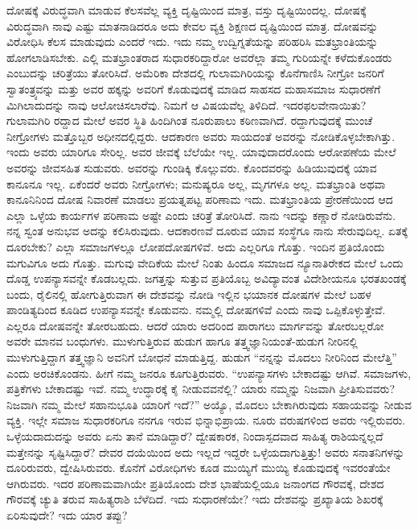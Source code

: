 ದೋಷಕ್ಕೆ ವಿರುದ್ಧವಾಗಿ ಮಾಡುವ ಕೆಲಸವೆಲ್ಲ ವ್ಯಕ್ತಿ ದೃಷ್ಟಿಯಿಂದ ಮಾತ್ರ, ವಸ್ತು ದೃಷ್ಟಿಯಿಂದಲ್ಲ. ದೋಷಕ್ಕೆ ವಿರುದ್ಧವಾಗಿ ನಾವು ಎಷ್ಟು ಮಾತನಾಡಿದರೂ ಅದು ಕೇವಲ ವ್ಯಕ್ತಿ ಶಿಕ್ಷಣದ ದೃಷ್ಟಿಯಿಂದ ಮಾತ್ರ. ದೋಷವನ್ನು ವಿರೋಧಿಸಿ ಕೆಲಸ ಮಾಡುವುದು ಎಂದರೆ ಇದು. ಇದು ನಮ್ಮ ಉದ್ವಿಗ್ನತೆಯನ್ನು ಪರಿಹರಿಸಿ ಮತಭ್ರಾಂತಿಯನ್ನು ಹೋಗಲಾಡಿಸಬೇಕು. ಎಲ್ಲಿ ಮತಭ್ರಾಂತರಾದ ಸುಧಾರಕರಿದ್ದಾರೋ ಅವರೆಲ್ಲಾ ತಮ್ಮ ಗುರಿಯನ್ನೇ ಕಳೆದುಕೊಂಡರು ಎಂಬುದನ್ನು ಚರಿತ್ರೆಯು ತೋರಿಸಿದೆ. ಅಮೆರಿಕಾ ದೇಶದಲ್ಲಿ ಗುಲಾಮಗಿರಿಯನ್ನು ಕೊನೆಗಾಣಿಸಿ ನೀಗ್ರೋ ಜನರಿಗೆ ಸ್ವಾತಂತ್ರ್ಯವನ್ನು ಮತ್ತು ಅವರ ಹಕ್ಕನ್ನು ಅವರಿಗೆ ಕೊಡುವುದಕ್ಕೆ ಮಾಡಿದ ಸಾಹಸದ ಮಹಾಸಮಾಜ ಸುಧಾರಣೆಗೆ ಮಿಗಿಲಾದುದನ್ನು ನಾವು ಆಲೋಚಿಸಲಾರೆವು. ನಿಮಗೆ ಆ ವಿಷಯವೆಲ್ಲ ತಿಳಿದಿದೆ. ಇದರ\break ಫಲವೇನಾಯಿತು? ಗುಲಾಮಗಿರಿ ರದ್ದಾದ ಮೇಲೆ ಅವರ ಸ್ಥಿತಿ ಹಿಂದಿಗಿಂತ ನೂರುಪಾಲು ಕಠಿಣವಾಗಿದೆ. ರದ್ದಾಗುವುದಕ್ಕೆ ಮುಂಚೆ ನೀಗ್ರೋಗಳು ಮತ್ತೊಬ್ಬರ ಅಧೀನದಲ್ಲಿದ್ದರು. ಆದಕಾರಣ ಅವರು ಸಾಯದಂತೆ ಅವರನ್ನು ನೋಡಿಕೊಳ್ಳಬೇಕಾಗಿತ್ತು. ಇಂದು ಅವರು ಯಾರಿಗೂ ಸೇರಿಲ್ಲ. ಅವರ ಜೀವಕ್ಕೆ ಬೆಲೆಯೇ ಇಲ್ಲ. ಯಾವುದಾದರೊಂದು ಆರೋಪಣೆಯ ಮೇಲೆ ಅವರನ್ನು ಜೀವಸಹಿತ ಸುಡುವರು. ಅವರನ್ನು ಗುಂಡಿಕ್ಕಿ ಕೊಲ್ಲುವರು. ಕೊಂದವರನ್ನು ಹಿಡಿಯುವುದಕ್ಕೆ ಯಾವ ಕಾನೂನೂ ಇಲ್ಲ. ಏಕೆಂದರೆ ಅವರು ನೀಗ್ರೋಗಳು; ಮನುಷ್ಯರೂ ಅಲ್ಲ, ಮೃಗಗಳೂ ಅಲ್ಲ. ಮತಭ್ರಾಂತಿ ಅಥವಾ ಕಾನೂನಿನಿಂದ ದೋಷ ನಿವಾರಣೆ ಮಾಡಲು ಪ್ರಯತ್ನಪಟ್ಟ ಪರಿಣಾಮ ಇದು. ಮತಭ್ರಾಂತಿಯ ಪ್ರೇರಣೆಯಿಂದ ಆದ ಎಲ್ಲಾ ಒಳ್ಳೆಯ ಕಾರ್ಯಗಳ ಪರಿಣಾಮ ಅಷ್ಟೇ ಎಂದು ಚರಿತ್ರೆ ತೋರಿಸಿದೆ. ನಾನು ಇದನ್ನು ಕಣ್ಣಾರೆ ನೋಡಿರುವೆನು. ನನ್ನ ಸ್ವಂತ ಅನುಭವ ಅದನ್ನು ಕಲಿಸಿರುವುದು. ಆದಕಾರಣವೆ ದೂರುವ ಯಾವ ಸಂಸ್ಥೆಗೂ ನಾನು ಸೇರುವುದಿಲ್ಲ. ಏತಕ್ಕೆ ದೂರಬೇಕು? ಎಲ್ಲಾ ಸಮಾಜಗಳಲ್ಲೂ ಲೋಪದೋಷಗಳಿವೆ. ಅದು ಎಲ್ಲರಿಗೂ ಗೊತ್ತು. ಇಂದಿನ ಪ್ರತಿಯೊಂದು ಮಗುವಿಗೂ ಅದು ಗೊತ್ತು. ಮಗುವು ವೇದಿಕೆಯ ಮೇಲೆ ನಿಂತು ಹಿಂದೂ ಸಮಾಜದ ನ್ಯೂನಾತಿರೇಕದ ಮೇಲೆ ಒಂದು ದೊಡ್ಡ ಉಪನ್ಯಾಸವನ್ನೇ ಕೊಡಬಲ್ಲದು. ಜಗತ್ತನ್ನು ಸುತ್ತುವ ಪ್ರತಿಯೊಬ್ಬ ಅವಿದ್ಯಾವಂತ ವಿದೇಶೀಯನೂ ಭರತಖಂಡಕ್ಕೆ ಬಂದು, ರೈಲಿನಲ್ಲಿ ಹೋಗುತ್ತಿರುವಾಗ ಈ ದೇಶವನ್ನು ನೋಡಿ ಇಲ್ಲಿನ ಭಯಾನಕ ದೋಷಗಳ ಮೇಲೆ ಬಹಳ ಪಾಂಡಿತ್ಯದಿಂದ ಕೂಡಿದ ಉಪನ್ಯಾಸವನ್ನೇ ಕೊಡುವನು. ನಮ್ಮಲ್ಲಿ ದೋಷಗಳಿವೆ ಎಂದು ನಾವು ಒಪ್ಪಿಕೊಳ್ಳುತ್ತೇವೆ. ಎಲ್ಲರೂ ದೋಷವನ್ನೇ ತೋರಬಹುದು. ಆದರೆ ಯಾರು ಅದರಿಂದ ಪಾರಾಗಲು ಮಾರ್ಗವನ್ನು ತೋರಬಲ್ಲರೋ ಅವರೇ ಮಾನವ ಬಂಧುಗಳು. ಮುಳುಗುತ್ತಿರುವ ಹುಡುಗ ಹಾಗೂ ತತ್ತ್ವಜ್ಞಾನಿಯಂತೆ-ಹುಡುಗ ನೀರಿನಲ್ಲಿ ಮುಳುಗುತ್ತಿದ್ದಾಗ ತತ್ತ್ವಜ್ಞಾನಿ ಅವನಿಗೆ ಬೋಧನೆ ಮಾಡುತ್ತಿದ್ದ. ಹುಡುಗ “ನನ್ನನ್ನು ಮೊದಲು ನೀರಿನಿಂದ ಮೇಲೆತ್ತಿ” ಎಂದು ಅರಚಿಕೊಂಡನು. ಹೀಗೆ ನಮ್ಮ ಜನರೂ ಕೂಗುತ್ತಿರುವರು. “ಉಪನ್ಯಾಸಗಳು ಬೇಕಾದಷ್ಟು ಆಗಿವೆ. ಸಮಾಜಗಳು, ಪತ್ರಿಕೆಗಳು ಬೇಕಾದಷ್ಟು ಇವೆ. ನಮ್ಮ ಉದ್ಧಾರಕ್ಕೆ ಕೈ ನೀಡುವವನೆಲ್ಲಿ? ಯಾರು ನಮ್ಮನ್ನು ನಿಜವಾಗಿ ಪ್ರೀತಿಸುವವರು? ನಿಜವಾಗಿ ನಮ್ಮ ಮೇಲೆ ಸಹಾನುಭೂತಿ ಯಾರಿಗೆ ಇದೆ?” ಅಯ್ಯೊ, ಮೊದಲು ಬೇಕಾಗಿರುವುದು ಸಹಾಯವನ್ನು ನೀಡುವ ವ್ಯಕ್ತಿ. ಇಲ್ಲೇ ಸಮಾಜ ಸುಧಾರಕರಿಗೂ ನನಗೂ ಇರುವ ಭಿನ್ನಾಭಿಪ್ರಾಯ. ನೂರು ವರುಷಗಳಿಂದ ಅವರು ಇಲ್ಲಿರುವರು. ಒಳ್ಳೆಯದಾದುದನ್ನು ಅವರು ಏನು ತಾನೆ ಮಾಡಿದ್ದಾರೆ? ದ್ವೇಷಕಾರಕ, ನಿಂದಾಸ್ಪದವಾದ ಸಾಹಿತ್ಯ ರಾಶಿಯನ್ನಲ್ಲದೆ ಮತ್ತೇನನ್ನು ಸೃಷ್ಟಿಸಿದ್ದಾರೆ? ದೇವರ ದಯೆಯಿಂದ ಅದು ಇಲ್ಲದೆ ಇದ್ದರೇ ಒಳ್ಳೆಯದಾಗುತ್ತಿತ್ತು! ಅವರು ಸನಾತನಿಗಳನ್ನು ದೂರಿರುವರು, ದ್ವೇಷಿಸಿರುವರು. ಕೊನೆಗೆ ವಿರೋಧಿಗಳು ಕೂಡ ಮುಯ್ಯಿಗೆ ಮುಯ್ಯಿ ಕೊಡುವುದಕ್ಕೆ ಇವರಂತೆಯೇ ಆಗಿರುವರು. ಇದರ ಪರಿಣಾಮವಾಗಿಯೇ ಪ್ರತಿಯೊಂದು ದೇಶ ಭಾಷೆಯಲ್ಲಿಯೂ ಜನಾಂಗದ ಗೌರವಕ್ಕೆ, ದೇಶದ ಗೌರವಕ್ಕೆ ಚ್ಯುತಿ ತರುವ ಸಾಹಿತ್ಯರಾಶಿ ಬೆಳೆದಿದೆ. ಇದು ಸುಧಾರಣೆಯೇ? ಇದು ದೇಶವನ್ನು ಪ್ರಖ್ಯಾತಿಯ ಶಿಖರಕ್ಕೆ ಏರಿಸುವುದೇ? ಇದು ಯಾರ ತಪ್ಪು?

